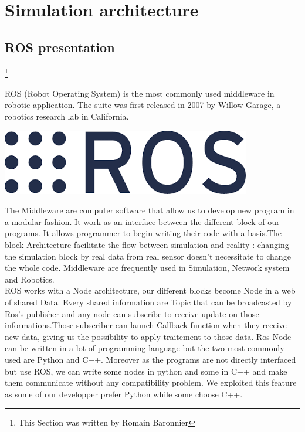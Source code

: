 \documentclass[a4paper]{report}
\begin{document}
\chapter{Simulation architecture}
\section{ROS presentation}
\footnote{This Section was written by Romain Baronnier}

ROS (Robot Operating System) is the most commonly used middleware in robotic application. The suite was first released in 2007 by Willow Garage, a robotics research lab in California.\\
\begin{center}
\includegraphics[scale=0.4]{image/ros.png}
\end{center}

The Middleware are computer software that allow us to develop new program in a modular fashion. It work as an interface between the different block of our programs. It allows programmer to begin writing their code with a basis.The block Architecture facilitate the flow between simulation and reality : changing the simulation block by real data from real sensor doesn't necessitate to change the whole code. Middleware are frequently used in Simulation, Network system and Robotics.\\

ROS works with a Node architecture, our different blocks become Node in a web of shared Data. Every shared information are Topic that can be broadcasted by Ros's publisher and any node can subscribe to receive update on those informations.Those subscriber can launch Callback function when they receive new data, giving us the possibility to apply traitement to those data. Ros Node can be written in a lot of programming language but the two most commonly used are Python and C++. Moreover as the programs are not directly interfaced but use ROS, we can write some nodes in python and some in C++ and make them communicate without any compatibility problem. We exploited this feature as some of our developper prefer Python while some choose C++.\\
\end{document}
